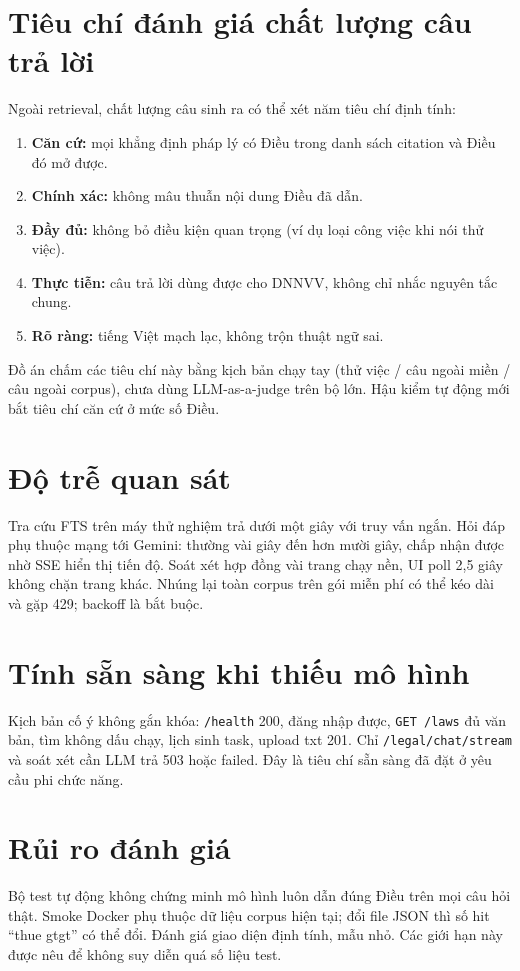 \section{Tiêu chí đánh giá chất lượng câu trả lời}

Ngoài retrieval, chất lượng câu sinh ra có thể xét năm tiêu chí định tính:

\begin{enumerate}
    \item \textbf{Căn cứ:} mọi khẳng định pháp lý có Điều trong danh sách citation
    và Điều đó mở được.
    \item \textbf{Chính xác:} không mâu thuẫn nội dung Điều đã dẫn.
    \item \textbf{Đầy đủ:} không bỏ điều kiện quan trọng (ví dụ loại công việc
    khi nói thử việc).
    \item \textbf{Thực tiễn:} câu trả lời dùng được cho DNNVV, không chỉ nhắc
    nguyên tắc chung.
    \item \textbf{Rõ ràng:} tiếng Việt mạch lạc, không trộn thuật ngữ sai.
\end{enumerate}

Đồ án chấm các tiêu chí này bằng kịch bản chạy tay (thử việc / câu ngoài miền /
câu ngoài corpus), chưa dùng LLM-as-a-judge trên bộ lớn. Hậu kiểm tự động mới
bắt tiêu chí căn cứ ở mức số Điều.

\section{Độ trễ quan sát}

Tra cứu FTS trên máy thử nghiệm trả dưới một giây với truy vấn ngắn. Hỏi đáp phụ
thuộc mạng tới Gemini: thường vài giây đến hơn mười giây, chấp nhận được nhờ SSE
hiển thị tiến độ. Soát xét hợp đồng vài trang chạy nền, UI poll 2,5 giây không
chặn trang khác. Nhúng lại toàn corpus trên gói miễn phí có thể kéo dài và gặp
429; backoff là bắt buộc.

\section{Tính sẵn sàng khi thiếu mô hình}

Kịch bản cố ý không gắn khóa: \texttt{/health} 200, đăng nhập được, \texttt{GET
/laws} đủ \soLuat{} văn bản, tìm không dấu chạy, lịch sinh task, upload txt 201.
Chỉ \texttt{/legal/chat/stream} và soát xét cần LLM trả 503 hoặc failed. Đây là
tiêu chí sẵn sàng đã đặt ở yêu cầu phi chức năng.

\section{Rủi ro đánh giá}

Bộ test tự động không chứng minh mô hình luôn dẫn đúng Điều trên mọi câu hỏi
thật. Smoke Docker phụ thuộc dữ liệu corpus hiện tại; đổi file JSON thì số hit
``thue gtgt'' có thể đổi. Đánh giá giao diện định tính, mẫu nhỏ. Các giới hạn
này được nêu để không suy diễn quá số liệu \soTest{} test.
